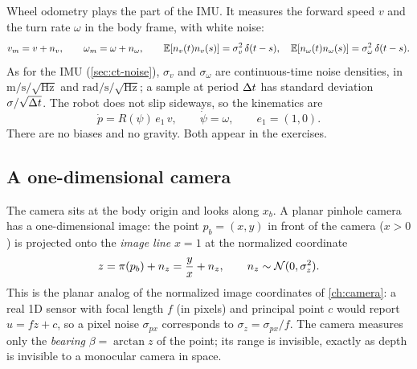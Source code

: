 Wheel odometry plays the part of the IMU. It measures the forward speed $v$ and the turn rate $\omega$ in the body frame, with white noise:
\begin{equation}
  v_m = v + n_v, \qquad \omega_m = \omega + n_\omega, \qquad
  \mathbb{E}[n_v(t)n_v(s)] = \sigma_v^2\,\delta(t - s),\quad \mathbb{E}[n_\omega(t)n_\omega(s)] = \sigma_\omega^2\,\delta(t - s).
  \label{eq:planar-odometry}
\end{equation}
As for the IMU (\cref{sec:ct-noise}), $\sigma_v$ and $\sigma_\omega$ are continuous-time noise densities, in $\mathrm{m/s/\sqrt{Hz}}$ and
$\mathrm{rad/s/\sqrt{Hz}}$; a sample at period ${\Delta t}$ has standard deviation $\sigma/\sqrt{{\Delta t}}$. The robot does not slip sideways, so the
kinematics are
\begin{equation}
  \dot p = R(\psi)\,e_1\,v, \qquad \dot\psi = \omega, \qquad e_1 = (1, 0).
  \label{eq:planar-kinematics}
\end{equation}
There are no biases and no gravity. Both appear in the exercises.

\subsection{A one-dimensional camera}

The camera sits at the body origin and looks along $x_b$. A planar pinhole camera has a one-dimensional image: the point
$p_b = (x, y)$ in front of the camera ($x > 0$) is projected onto the \emph{image line} $x = 1$ at the normalized coordinate
\begin{equation}
  z = \pi(p_b) + n_z = \frac{y}{x} + n_z, \qquad n_z \sim \mathcal{N}(0, \sigma_z^2).
  \label{eq:planar-camera}
\end{equation}
This is the planar analog of the normalized image coordinates of \cref{ch:camera}: a real 1D sensor with focal length $f$ (in pixels) and
principal point $c$ would report $u = fz + c$, so a pixel noise $\sigma_{px}$ corresponds to $\sigma_z = \sigma_{px}/f$. The camera measures only the
\emph{bearing} $\beta = \arctan z$ of the point; its range is invisible, exactly as depth is invisible to a monocular camera in space.

